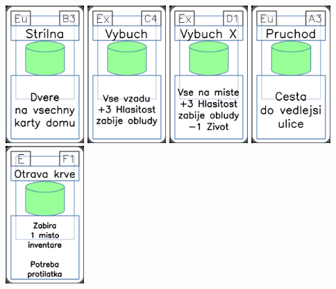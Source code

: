 \documentclass[a4paper]{article}
\begin{document}
	\includegraphics[width=3.0cm]{img-4_37}
	\includegraphics[width=3.0cm]{img-4_13}
	\includegraphics[width=3.0cm]{img-4_15}
	\includegraphics[width=3.0cm]{img-4_32}
	\includegraphics[width=3.0cm]{img-4_55}
\end{document}
